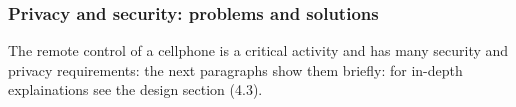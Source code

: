 \subsubsection{Privacy and security: problems and solutions}
\small{The remote control of a cellphone is a critical activity and has many security and privacy requirements: the next paragraphs show them briefly: for in-depth explainations see the design section (4.3).}
\vspace{10pt}